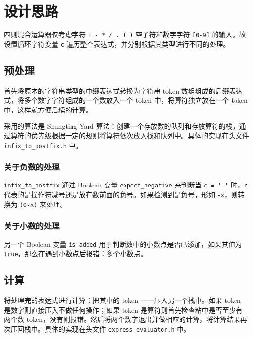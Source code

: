 \documentclass[UTF8]{ctexart}
\begin{document}
\pagestyle{fancy}
\fancyhead{}
\rhead{\today}

\section{设计思路}

四则混合运算器仅考虑字符 \verb|+ - * / . ( )| 空子符和数字字符 \verb|[0-9]| 的输入。故设置循环字符变量 \verb|c| 遍历整个表达式，并分别根据其类型进行不同的处理。

\subsection{预处理}

首先将原本的字符串类型的中缀表达式转换为字符串 token 数组组成的后缀表达式，将多个数字字符组成的一个数放入一个 token 中，将算符独立放在一个 token 中，这样就方便后续的计算。

采用的算法是 Shungting Yard 算法：创建一个存放数的队列和存放算符的栈，通过算符的优先级根据一定的规则将算符依次放入栈和队列中。具体的实现在头文件 \verb|infix_to_postfix.h| 中。

\subsubsection{关于负数的处理}

\verb|infix_to_postfix| 通过 Boolean 变量 \verb|expect_negative| 来判断当 \verb|c = '-'| 时，\verb|c| 代表的是操作符减号还是放在数前面的负号。如果检测到是负号，形如 \verb|-x|，则转换为 \verb|(0-x)| 来处理。

\subsubsection{关于小数的处理}

另一个 Boolean 变量 \verb|is_added| 用于判断数中的小数点是否已添加，如果其值为 \verb|true|，那么在遇到小数点后报错：多个小数点。

\subsection{计算}

将处理完的表达式进行计算：把其中的 token 一一压入另一个栈中。如果 token 是数字则直接压入不做任何操作；如果 token 是算符则首先检查粘中是否至少有两个数 token，没有则报错。然后将两个数字退出并做相应的计算，将计算结果再次压回栈中。具体的实现在头文件 \verb|express_evaluator.h| 中。
\end{document}
